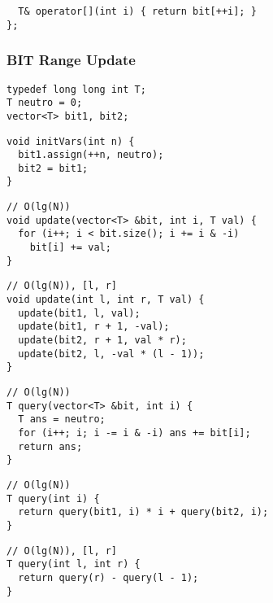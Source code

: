 \documentclass[twoside]{article}
\newcommand{\fileTitleStyle}{\large\underline}
\begin{document}
\begin{multicols*}{2}
\begin{verbatim}
  T& operator[](int i) { return bit[++i]; }
};
\end{verbatim}

\subsubsectionfont{\centering\bfseries\Large}
\subsubsectionfont{\fileTitleStyle}
\subsubsection*{BIT Range Update}
\begin{verbatim}
typedef long long int T;
T neutro = 0;
vector<T> bit1, bit2;
\end{verbatim}
\vspace{-12pt}
\begin{verbatim}
void initVars(int n) {
  bit1.assign(++n, neutro);
  bit2 = bit1;
}
\end{verbatim}
\vspace{-12pt}
\begin{verbatim}
// O(lg(N))
void update(vector<T> &bit, int i, T val) {
  for (i++; i < bit.size(); i += i & -i)
    bit[i] += val;
}
\end{verbatim}
\vspace{-12pt}
\begin{verbatim}
// O(lg(N)), [l, r]
void update(int l, int r, T val) {
  update(bit1, l, val);
  update(bit1, r + 1, -val);
  update(bit2, r + 1, val * r);
  update(bit2, l, -val * (l - 1));
}
\end{verbatim}
\vspace{-12pt}
\begin{verbatim}
// O(lg(N))
T query(vector<T> &bit, int i) {
  T ans = neutro;
  for (i++; i; i -= i & -i) ans += bit[i];
  return ans;
}
\end{verbatim}
\vspace{-12pt}
\begin{verbatim}
// O(lg(N))
T query(int i) {
  return query(bit1, i) * i + query(bit2, i);
}
\end{verbatim}
\vspace{-12pt}
\begin{verbatim}
// O(lg(N)), [l, r]
T query(int l, int r) {
  return query(r) - query(l - 1);
}
\end{verbatim}

\subsubsectionfont{\centering\bfseries\Large}
\subsubsectionfont{\fileTitleStyle}

\end{multicols*}
\end{document}
